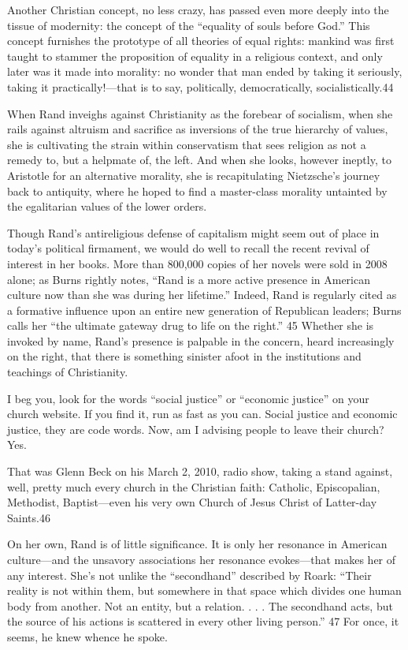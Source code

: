  \par 
Another Christian concept, no less crazy, has passed even more deeply into the tissue of modernity: the concept of the “equality of souls before God.” This concept furnishes the prototype of all theories of equal rights: mankind was first taught to stammer the proposition of equality in a religious context, and only later was it made into morality: no wonder that man ended by taking it seriously, taking it practically!—that is to say, politically, democratically, socialistically.{\color{blue}44}
 \par 
When Rand inveighs against Christianity as the forebear of socialism, when she rails against altruism and sacrifice as inversions of the true hierarchy of values, she is cultivating the strain within conservatism that sees religion as not a remedy to, but a helpmate of, the left. And when she looks, however ineptly, to Aristotle for an alternative morality, she is recapitulating Nietzsche’s journey back to antiquity, where he hoped to find a master-class morality untainted by the egalitarian values of the lower orders.
 \par 
Though Rand’s antireligious defense of capitalism might seem out of place in today’s political firmament, we would do well to recall the recent revival of interest in her books. More than 800,000 copies of her novels were sold in 2008 alone; as Burns rightly notes, “Rand is a more active presence in American culture now than she was during her lifetime.” Indeed, Rand is regularly cited as a formative influence upon an entire new generation of Republican leaders; Burns calls her “the ultimate gateway drug to life on the right.” {\color{blue}45} Whether she is invoked by name, Rand’s presence is palpable in the concern, heard increasingly on the right, that there is something sinister afoot in the institutions and teachings of Christianity.
 \par 
I beg you, look for the words “social justice” or “economic justice” on your church website. If you find it, run as fast as you can. Social justice and economic justice, they are code words. Now, am I advising people to leave their church? Yes.
 \par 
That was Glenn Beck on his March 2, 2010, radio show, taking a stand against, well, pretty much every church in the Christian faith: Catholic, Episcopalian, Methodist, Baptist—even his very own Church of Jesus Christ of Latter-day Saints.{\color{blue}46}
 \par 
On her own, Rand is of little significance. It is only her resonance in American culture—and the unsavory associations her resonance evokes—that makes her of any interest. She’s not unlike the “secondhand” described by Roark: “Their reality is not within them, but somewhere in that space which divides one human body from another. Not an entity, but a relation. . . . The secondhand acts, but the source of his actions is scattered in every other living person.” {\color{blue}47} For once, it seems, he knew whence he spoke.
